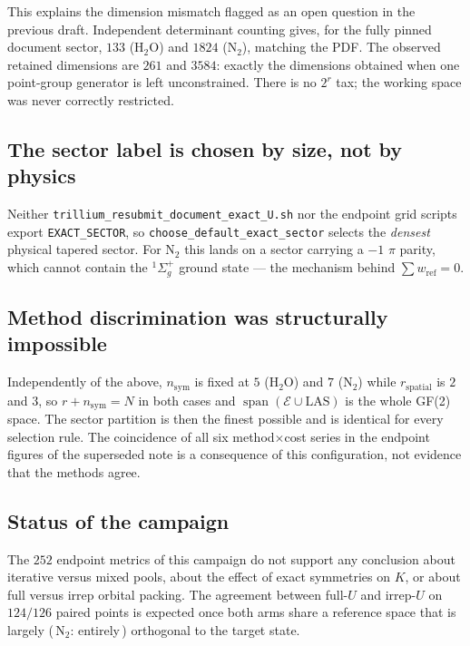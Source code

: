 This explains the dimension mismatch flagged as an open question in the
previous draft. Independent determinant counting gives, for the fully pinned
document sector, $133$ ($\mathrm{H_2O}$) and $1824$ ($\mathrm{N_2}$), matching
the PDF. The observed retained dimensions are $261$ and $3584$: exactly the
dimensions obtained when one point-group generator is left unconstrained.
There is no $2^{r}$ tax; the working space was never correctly restricted.

\subsection{The sector label is chosen by size, not by physics}

Neither \texttt{trillium\_resubmit\_document\_exact\_U.sh} nor the endpoint
grid scripts export \texttt{EXACT\_SECTOR}, so
\texttt{choose\_default\_exact\_sector} selects the \emph{densest} physical
tapered sector. For $\mathrm{N_2}$ this lands on a sector carrying a $-1$
$\pi$ parity, which cannot contain the ${}^1\Sigma_g^+$ ground state --- the
mechanism behind $\sum w_{\mathrm{ref}} = 0$.

\subsection{Method discrimination was structurally impossible}

Independently of the above, $n_{\mathrm{sym}}$ is fixed at $5$
($\mathrm{H_2O}$) and $7$ ($\mathrm{N_2}$) while $r_{\mathrm{spatial}}$ is $2$
and $3$, so $r + n_{\mathrm{sym}} = N$ in both cases and
$\operatorname{span}(\mathcal E \cup \mathrm{LAS})$ is the whole GF(2) space.
The sector partition is then the finest possible and is identical for every
selection rule. The coincidence of all six method$\times$cost series in
the endpoint figures of the superseded note is a consequence of this
configuration, not evidence that the methods agree.

\subsection{Status of the campaign}

The $252$ endpoint metrics of this campaign do not support any conclusion
about iterative versus mixed pools, about the effect of exact symmetries on
$K$, or about full versus irrep orbital packing. The agreement between
full-$U$ and irrep-$U$ on $124/126$ paired points is expected once both arms
share a reference space that is largely (\,$\mathrm{N_2}$: entirely\,)
orthogonal to the target state.

